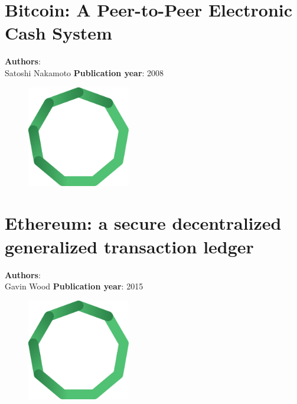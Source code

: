 \documentclass[11pt,fleqn]{book} %
\begin{document}
\chapter{Bitcoin: A Peer-to-Peer Electronic Cash System}
\vspace*{-7mm}
\Large \textbf{Authors}: \\
Satoshi Nakamoto
\newline\newline
\textbf{Publication year}: 2008
\begin{figure}[b]
    \centering
    \includegraphics[width=0.4\textwidth]{distributed-systems.pdf}
\end{figure}


\chapter{Ethereum: a secure decentralized generalized transaction ledger}
\vspace*{-7mm}
\Large \textbf{Authors}: \\
Gavin Wood
\newline\newline
\textbf{Publication year}: 2015
\begin{figure}[b]
    \centering
    \includegraphics[width=0.4\textwidth]{distributed-systems.pdf}
\end{figure}


\pagecolor{emerald}\afterpage{}
\newpage\null\thispagestyle{empty}\newpage
\end{document}
